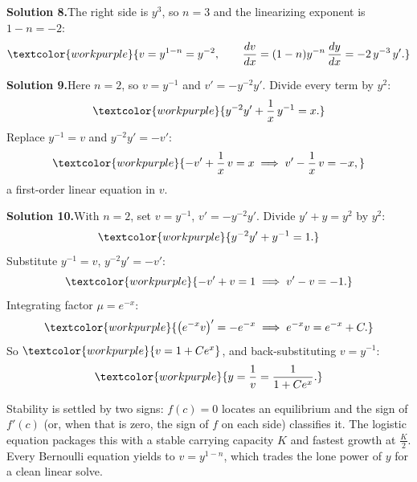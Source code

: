 \medskip
\noindent\textbf{Solution 8.}\quad The right side is $y^{3}$, so $n = 3$ and the
linearizing exponent is $1 - n = -2$:
\[ \textcolor{workpurple}{v = y^{1-n} = y^{-2}, \qquad \frac{dv}{dx} = (1-n)y^{-n}\,\frac{dy}{dx} = -2\,y^{-3}\,y'.} \]

\medskip
\noindent\textbf{Solution 9.}\quad Here $n = 2$, so $v = y^{-1}$ and
$v' = -y^{-2}y'$. Divide every term by $y^{2}$:
\[ \textcolor{workpurple}{y^{-2}y' + \frac{1}{x}\,y^{-1} = x.} \]
Replace $y^{-1} = v$ and $y^{-2}y' = -v'$:
\[ \textcolor{workpurple}{-v' + \frac{1}{x}\,v = x \;\Longrightarrow\; v' - \frac{1}{x}\,v = -x,} \]
a first-order linear equation in $v$.

\medskip
\noindent\textbf{Solution 10.}\quad With $n = 2$, set $v = y^{-1}$,
$v' = -y^{-2}y'$. Divide $y' + y = y^{2}$ by $y^{2}$:
\[ \textcolor{workpurple}{y^{-2}y' + y^{-1} = 1.} \]
Substitute $y^{-1} = v$, $y^{-2}y' = -v'$:
\[ \textcolor{workpurple}{-v' + v = 1 \;\Longrightarrow\; v' - v = -1.} \]
Integrating factor $\mu = e^{-x}$:
\[ \textcolor{workpurple}{\left(e^{-x}v\right)' = -e^{-x} \;\Longrightarrow\; e^{-x}v = e^{-x} + C.} \]
So $\textcolor{workpurple}{v = 1 + Ce^{x}}$, and back-substituting $v = y^{-1}$:
\[ \textcolor{workpurple}{y = \frac{1}{v} = \frac{1}{1 + Ce^{x}}.} \]

\vspace{0.8em}
\begin{conceptbox}
Stability is settled by two signs: \textcolor{accentorange}{$f(c)=0$} locates an
equilibrium and \textcolor{accentorange}{the sign of $f'(c)$} (or, when that is
zero, the sign of $f$ on each side) classifies it. The
\textcolor{accentorange}{logistic equation} packages this with a stable carrying
capacity $K$ and fastest growth at $\tfrac{K}{2}$. Every Bernoulli equation
yields to \textcolor{accentorange}{$v = y^{1-n}$}, which trades the lone power of
$y$ for a clean linear solve.
\end{conceptbox}


